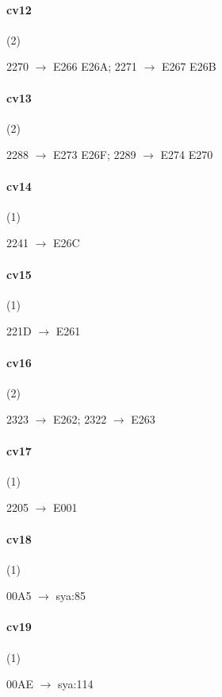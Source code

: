 \paragraph{cv12} (2)
\raggedright\small 2270 $\to$ E266 \textbar{} E26A; 2271 $\to$ E267 \textbar{}
E26B\par

\paragraph{cv13} (2)
\raggedright\small 2288 $\to$ E273 \textbar{} E26F; 2289 $\to$ E274 \textbar{}
E270\par

\paragraph{cv14} (1)
\raggedright\small 2241 $\to$ E26C\par

\paragraph{cv15} (1)
\raggedright\small 221D $\to$ E261\par

\paragraph{cv16} (2)
\raggedright\small 2323 $\to$ E262; 2322 $\to$ E263\par

\paragraph{cv17} (1)
\raggedright\small 2205 $\to$ E001\par

\paragraph{cv18} (1)
\raggedright\small 00A5 $\to$ sya:85\par

\paragraph{cv19} (1)
\raggedright\small 00AE $\to$ sya:114\par

